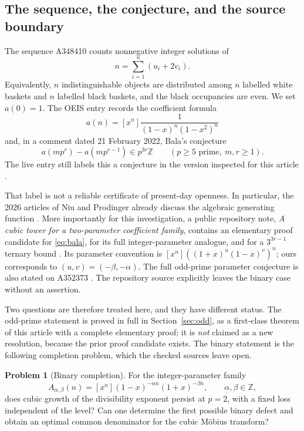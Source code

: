 \documentclass[11pt,a4paper]{article}
\numberwithin{equation}{section}
\theoremstyle{definition}
\newtheorem{problem}[theorem]{Problem}
\theoremstyle{remark}
\newcommand{\Z}{\mathbb Z}
\newcommand{\A}{A_{\alpha,\beta}}
\begin{document}
\subsection{The sequence, the conjecture, and the source boundary}
The sequence A348410 counts nonnegative integer solutions of
\begin{equation}\label{eq:baskets}
 n=\sum_{i=1}^n (u_i+2v_i).
\end{equation}
Equivalently, $n$ indistinguishable objects are distributed among $n$ labelled
white baskets and $n$ labelled black baskets, and the black occupancies are
even. We set $a(0)=1$. The OEIS entry records the coefficient formula
\begin{equation}\label{eq:an}
 a(n)=[x^n]\frac1{(1-x)^n(1-x^2)^n}
\end{equation}
and, in a comment dated 21 February 2022, Bala's conjecture
\begin{equation}\label{eq:bala}
 a(mp^r)-a(mp^{r-1})\in p^{3r}\Z
 \qquad(p\ge5\text{ prime},\ m,r\ge1).
\end{equation}
The live entry still labels this a conjecture in the version inspected for
this article \cite{oeis348410}.

That label is not a reliable certificate of present-day openness. In
particular, the 2026 articles of Niu and Prodinger already discuss the
algebraic generating function \cite{niu,prodinger}. More importantly for
this investigation, a public repository note, \emph{A cubic tower for a
two-parameter coefficient family}, contains an elementary proof candidate
for \eqref{eq:bala}, for its full integer-parameter analogue, and for a
$3^{3r-1}$ ternary bound \cite{prior}. Its parameter convention is
$[x^n]((1+x)^u(1-x)^v)^n$; ours corresponds to $(u,v)=(-\beta,-\alpha)$.
The full odd-prime parameter conjecture is also stated on A352373
\cite{oeis352373}. The repository source explicitly leaves the binary case
without an assertion.

Two questions are therefore treated here, and they have different status.
The odd-prime statement is proved in full in Section~\ref{sec:odd}, as a
first-class theorem of this article with a complete elementary proof; it is
\emph{not} claimed as a new resolution, because the prior proof candidate
exists. The binary statement is the following completion problem, which the
checked sources leave open.

\begin{problem}[Binary completion]\label{prob:binary}
For the integer-parameter family
\begin{equation}\label{eq:family}
 \A(n)=[x^n](1-x)^{-\alpha n}(1+x)^{-\beta n},
 \qquad \alpha,\beta\in\Z,
\end{equation}
does cubic growth of the divisibility exponent persist at $p=2$, with a
fixed loss independent of the level? Can one determine the first possible
binary defect and obtain an optimal common denominator for the cubic
M\"obius transform?
\end{problem}
\end{document}
